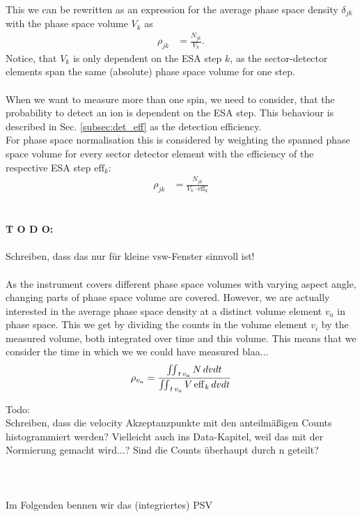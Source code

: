 This we can be rewritten as an expression for the average phase space density $\delta_{jk}$ with the phase space volume $V_{k}$ as 
\begin{align*}
\rho_{jk} &= \frac{N_{jk}}{V_{k}}.
\end{align*}
Notice, that $V_{k}$ is only dependent on the ESA step $k$, as the sector-detector elements span the same (absolute) phase space volume for one step.\\\\
When we want to measure more than one spin, we need to consider, that the probability to detect an ion is dependent on the ESA step. This behaviour is described in Sec. \ref{subsec:det_eff} as the detection efficiency.\\
For phase space normalisation this is considered by weighting the spanned phase space volume for every sector detector element with the efficiency of the respective ESA step $\mathrm{eff}_k$: 
\begin{align*}
\rho_{jk} &= \frac{N_{jk}}{V_{k}\cdot \mathrm{eff}_k}
\end{align*}
\\ \\
\textbf{T O D O:}
\\ \\
Schreiben, dass das nur für kleine vsw-Fenster sinnvoll ist!
\\ \\
As the instrument covers different phase space volumes with varying aspect angle, changing parts of phase space volume are covered.
However, we are actually interested in the average phase space density at a distinct volume element $v_a$ in phase space. This we get by dividing the counts in the volume element $v_i$ by the measured volume, both integrated over time and this volume. This means that we consider the time in which we we could have measured blaa...
\begin{align*}
\rho_{v_a} = \frac{\iint\displaylimits_{t\,v_a} N \, dv dt}{\iint\displaylimits_{t\,v_a} V\,\mathrm{eff}_k\,dv dt}
\end{align*}

Todo:\\
Schreiben, dass die velocity Akzeptanzpunkte mit den anteilmäßigen Counts histogrammiert werden? Vielleicht auch ins Data-Kapitel, weil das mit der Normierung gemacht wird...? Sind die Counts überhaupt durch n geteilt?\\ \\
\\ \\
Im Folgenden bennen wir das (integriertes) PSV


